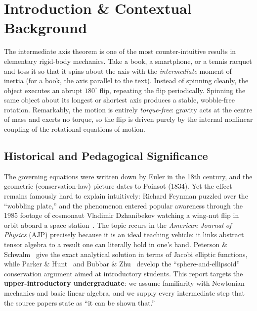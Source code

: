\documentclass[11pt,letterpaper]{article}
\begin{document}
\section{Introduction \& Contextual Background}
The intermediate axis theorem is one of the most counter-intuitive results in
elementary rigid-body mechanics. Take a book, a smartphone, or a tennis
racquet and toss it so that it spins about the axis with the
\emph{intermediate} moment of inertia (for a book, the axis parallel to the
text). Instead of spinning cleanly, the object executes an abrupt
$180^\circ$ flip, repeating the flip periodically. Spinning the same object
about its longest or shortest axis produces a stable, wobble-free rotation.
Remarkably, the motion is entirely \emph{torque-free}: gravity acts at the
centre of mass and exerts no torque, so the flip is driven purely by the
internal nonlinear coupling of the rotational equations of motion.

\subsection{Historical and Pedagogical Significance}
The governing equations were written down by Euler in the 18th century, and the
geometric (conservation-law) picture dates to Poinsot (1834). Yet the effect
remains famously hard to explain intuitively: Richard Feynman puzzled over the
``wobbling plate,'' and the phenomenon entered popular awareness through the
1985 footage of cosmonaut Vladimir Dzhanibekov watching a wing-nut flip in
orbit aboard a space station~\cite{muller2019}. The topic recurs in the
\textit{American Journal of Physics} (AJP) precisely because it is an ideal
teaching vehicle: it links abstract tensor algebra to a result one can
literally hold in one's hand. Peterson \& Schwalm~\cite{peterson2021} give the
exact analytical solution in terms of Jacobi elliptic functions, while Parker
\& Hunt~\cite{parker2020} and Bubbar \& Zhu~\cite{bubbar2025} develop the
``sphere-and-ellipsoid'' conservation argument aimed at introductory students.
This report targets the \textbf{upper-introductory undergraduate}: we assume
familiarity with Newtonian mechanics and basic linear algebra, and we supply
every intermediate step that the source papers state as ``it can be shown
that.''
\end{document}
